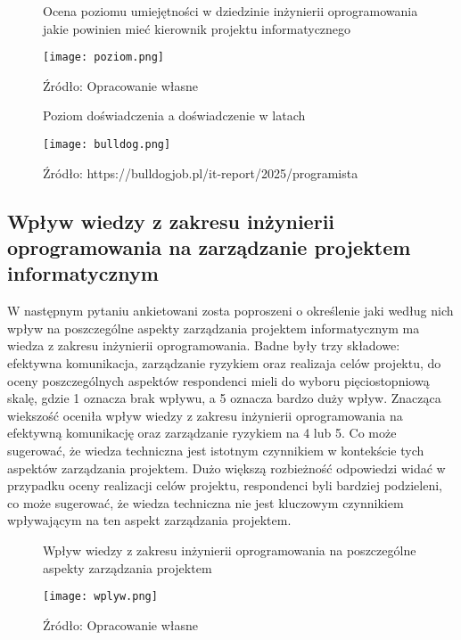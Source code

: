 \begin{figure}
  \caption{Ocena poziomu umiejętności w dziedzinie inżynierii oprogramowania jakie powinien mieć kierownik projektu informatycznego}
  \centering
  \texttt{[image: poziom.png]}
  \caption*{Źródło: Opracowanie własne}
\end{figure}

\begin{figure}
  \caption{Poziom doświadczenia a doświadczenie w latach}
  \centering
  \texttt{[image: bulldog.png]}
  \caption*{Źródło: https://bulldogjob.pl/it-report/2025/programista}
\end{figure}

\subsection{Wpływ wiedzy z zakresu inżynierii oprogramowania na zarządzanie projektem informatycznym}
W następnym pytaniu ankietowani zosta poproszeni o określenie jaki według nich wpływ na poszczególne aspekty zarządzania projektem informatycznym ma wiedza z zakresu inżynierii oprogramowania. Badne były trzy składowe: efektywna komunikacja, zarządzanie ryzykiem oraz realizaja celów projektu, do oceny poszczególnych aspektów respondenci mieli do wyboru pięciostopniową skalę, gdzie 1 oznacza brak wpływu, a 5 oznacza bardzo duży wpływ. Znacząca wiekszość oceniła wpływ wiedzy z zakresu inżynierii oprogramowania na efektywną komunikację oraz zarządzanie ryzykiem na 4 lub 5. Co może sugerować, że wiedza techniczna jest istotnym czynnikiem w kontekście tych aspektów zarządzania projektem. Dużo większą rozbieżność odpowiedzi widać w przypadku oceny realizacji celów projektu, respondenci byli bardziej podzieleni, co może sugerować, że wiedza techniczna nie jest kluczowym czynnikiem wpływającym na ten aspekt zarządzania projektem.

\begin{figure}
  \caption{Wpływ wiedzy z zakresu inżynierii oprogramowania na poszczególne aspekty zarządzania projektem}
  \centering
  \texttt{[image: wplyw.png]}
  \caption*{Źródło: Opracowanie własne}
\end{figure}

